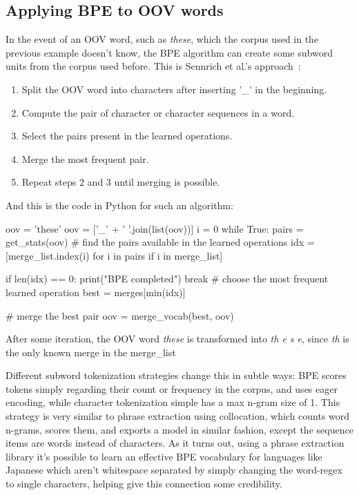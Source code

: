 \subsection{Applying BPE to OOV words}

In the event of an OOV word, such as \emph{these}, which the corpus used in the previous example doesn't know, the BPE algorithm can create some subword units from the corpus used before. This is Sennrich et al.'s approach~\cite{sennrich2015neural}:

\begin{enumerate}
    \item Split the OOV word into characters after inserting '\_' in the beginning.
    \item Compute the pair of character or character sequences in a word.
    \item Select the pairs present in the learned operations.
    \item Merge the most frequent pair.
    \item Repeat steps 2 and 3 until merging is possible.
\end{enumerate}

And this is the code in Python for such an algorithm:

\begin{python}
oov = 'these'
oov = ['_' + ' '.join(list(oov))]
i = 0
while True:
    pairs = get_stats(oov)
    # find the pairs available in the learned operations
    idx = [merge_list.index(i) for i in pairs if i in merge_list]

    if len(idx) == 0:
        print("BPE completed")
        break
    # choose the most frequent learned operation
    best = merges[min(idx)]

    # merge the best pair
    oov = merge_vocab(best, oov)
\end{python}

After some iteration, the OOV word \emph{these} is transformed into \emph{th e s e}, since \emph{th} is the only known merge in the merge\_list

Different subword tokenization strategies change this in subtle ways: BPE scores tokens simply regarding their count or frequency in the corpus, and uses eager encoding, while character tokenization simple has a max n-gram size of 1. This strategy is very similar to phrase extraction using collocation, which counts word n-grams, scores them, and exports a model in similar fashion, except the sequence items are words instead of characters. As it turns out, using a phrase extraction library it's possible to learn an effective BPE vocabulary for languages like Japanese which aren't whitespace separated by simply changing the word-regex to single characters, helping give this connection some credibility.

